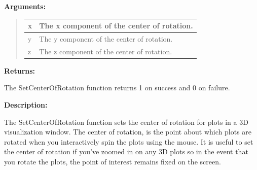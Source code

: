 \documentclass[letterpaper,10pt,english]{sphinxmanual}
\begin{document}
\begin{DUlineblock}{0em}
\item[] 
\item[] \textbf{Arguments:}
\end{DUlineblock}
\begin{quote}

\begin{tabulary}{\linewidth}{|L|L|}
\hline

x
 & 
The x component of the center of rotation.
\\
\hline
y
 & 
The y component of the center of rotation.
\\
\hline
z
 & 
The z component of the center of rotation.
\\
\hline\end{tabulary}

\end{quote}

\begin{DUlineblock}{0em}
\item[] 
\item[] \textbf{Returns:}
\item[] The SetCenterOfRotation function returns 1 on success and 0 on failure.
\item[] 
\item[] \textbf{Description:}
\item[] The SetCenterOfRotation function sets the center of rotation for plots in
a 3D visualization window. The center of rotation, is the point about which
plots are rotated when you interactively spin the plots using the mouse. It
is useful to set the center of rotation if you've zoomed in on any 3D plots
so in the event that you rotate the plots, the point of interest remains
fixed on the screen.
\end{DUlineblock}

\begin{DUlineblock}{0em}
\item[] 
\end{DUlineblock}
\end{document}
